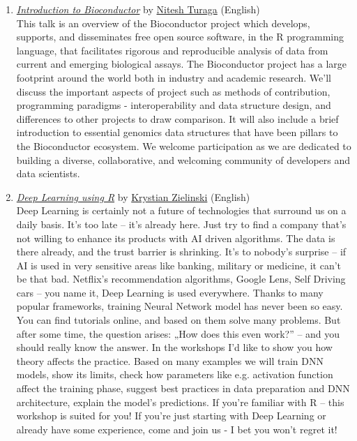 \begin{enumerate}
    \item \textit{\href{https://www.youtube.com/watch?v=r_X7_35aDMI}{Introduction to Bioconductor}} by \href{https://www.linkedin.com/in/niteshturaga/}{Nitesh Turaga} (English)\\ This talk is an overview of the Bioconductor project which develops, supports, and disseminates free open source software, in the R programming language, that facilitates rigorous and reproducible analysis of data from current and emerging biological assays. The Bioconductor project has a large footprint around the world both in industry and academic research. We'll discuss the important aspects of project such as methods of contribution, programming paradigms - interoperability and data structure design, and differences to other projects to draw comparison. It will also include a brief introduction to essential genomics data structures that have been pillars to the Bioconductor ecosystem. We welcome participation as we are dedicated to building a diverse, collaborative, and welcoming community of developers and data scientists.\\
    
    \item \textit{\href{https://www.youtube.com/watch?v=Mg7e1B-J2Oo}{Deep Learning using R}} by \href{https://www.linkedin.com/in/krystian-zieli\%C5\%84ski-53399a167/}{Krystian Zielinski} (English)\\
    Deep Learning is certainly not a future of technologies that surround us on a daily basis. It's too late – it's already here. Just try to find a company that's not willing to enhance its products with AI driven algorithms. The data is there already, and the trust barrier is shrinking. It's to nobody's surprise – if AI is used in very sensitive areas like banking, military or medicine, it can't be that bad. Netflix's recommendation algorithms, Google Lens, Self Driving cars – you name it, Deep Learning is used everywhere. Thanks to many popular frameworks, training Neural Network model has never been so easy. You can find tutorials online, and based on them solve many problems. But after some time, the question arises: „How does this even work?” – and you should really know the answer. In the workshops I'd like to show you how theory affects the practice. Based on many examples we will train DNN models, show its limits, check how parameters like e.g. activation function affect the training phase, suggest best practices in data preparation and DNN architecture, explain the model's predictions. If you're familiar with R – this workshop is suited for you! If you're just starting with Deep Learning or already have some experience, come and join us - I bet you won't regret it!\\
    
\end{enumerate}
